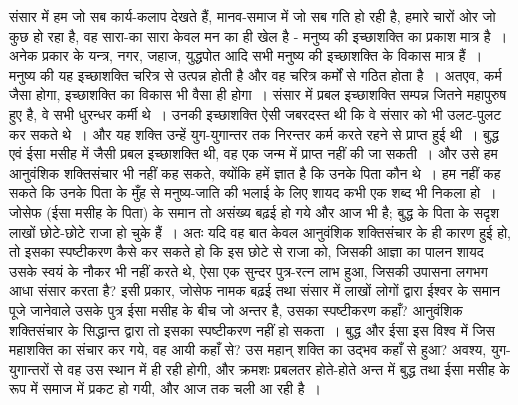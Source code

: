 संसार में हम जो सब कार्य-कलाप देखते हैं, मानव-समाज में जो सब गति हो रही है, हमारे चारों ओर जो कुछ हो रहा है, वह सारा-का सारा केवल मन का ही खेल है - मनुष्य की इच्छाशक्ति का प्रकाश मात्र है~। अनेक प्रकार के यन्त्र, नगर, जहाज, युद्धपोत आदि सभी मनुष्य की इच्छाशक्ति के विकास मात्र हैं~। मनुष्य की यह इच्छाशक्ति चरित्र से उत्पन्न होती है और वह चरित्र कर्मों से गठित होता है~। अतएव, कर्म जैसा होगा, इच्छाशक्ति का विकास भी वैसा ही होगा~। संसार में प्रबल इच्छाशक्ति सम्पन्न जितने महापुरुष हुए है, वे सभी धुरन्धर कर्मी थे~। उनकी इच्छाशक्ति ऐसी जबरदस्त थी कि वे संसार को भी उलट-पुलट कर सकते थे~। और यह शक्ति उन्हें युग-युगान्तर तक निरन्तर कर्म करते रहने से प्राप्त हुई थी~। बुद्ध एवं ईसा मसीह में जैसी प्रबल इच्छाशक्ति थी, वह एक जन्म में प्राप्त नहीं की जा सकती~। और उसे हम आनुवंशिक शक्तिसंचार भी नहीं कह सकते, क्योंकि हमें ज्ञात है कि उनके पिता कौन थे~। हम नहीं कह सकते कि उनके पिता के मुँह से मनुष्य-जाति की भलाई के लिए शायद कभी एक शब्द भी निकला हो~। जोसेफ (ईसा मसीह के पिता) के समान तो असंख्य बढ़ई हो गये और आज भी है; बुद्ध के पिता के सदृश लाखों छोटे-छोटे राजा हो चुके हैं~। अतः यदि वह बात केवल आनुवंशिक शक्तिसंचार के ही कारण हुई हो, तो इसका स्पष्टीकरण कैसे कर सकते हो कि इस छोटे से राजा को, जिसकी आज्ञा का पालन शायद उसके स्वयं के नौकर भी नहीं करते थे, ऐसा एक सुन्दर पुत्र-रत्न लाभ हुआ, जिसकी उपासना लगभग आधा संसार करता है? इसी प्रकार, जोसेफ नामक बढ़ई तथा संसार में लाखों लोगों द्वारा ईश्वर के समान पूजे जानेवाले उसके पुत्र ईसा मसीह के बीच जो अन्तर है, उसका स्पष्टीकरण कहाँ? आनुवंशिक शक्तिसंचार के सिद्धान्त द्वारा तो इसका स्पष्टीकरण नहीं हो सकता~। बुद्ध और ईसा इस विश्व में जिस महाशक्ति का संचार कर गये, वह आयी कहाँ से? उस महान् शक्ति का उद्भव कहाँ से हुआ? अवश्य, युग-युगान्तरों से वह उस स्थान में ही रही होगी, और क्रमशः प्रबलतर होते-होते अन्त में बुद्ध तथा ईसा मसीह के रूप में समाज में प्रकट हो गयी, और आज तक चली आ रही है~।

